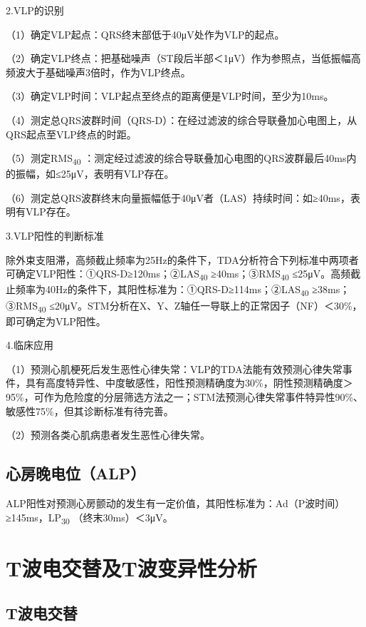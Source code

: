 2.VLP的识别

（1）确定VLP起点：QRS终末部低于40μV处作为VLP的起点。

（2）确定VLP终点：把基础噪声（ST段后半部＜1μV）作为参照点，当低振幅高频波大于基础噪声3倍时，作为VLP终点。

（3）确定VLP时间：VLP起点至终点的距离便是VLP时间，至少为10ms。

（4）测定总QRS波群时间（QRS-D）：在经过滤波的综合导联叠加心电图上，从QRS起点至VLP终点的时距。

（5）测定RMS\textsubscript{40}
：测定经过滤波的综合导联叠加心电图的QRS波群最后40ms内的振幅，如≤25μV，表明有VLP存在。

（6）测定总QRS波群终末向量振幅低于40μV者（LAS）持续时间：如≥40ms，表明有VLP存在。

3.VLP阳性的判断标准

除外束支阻滞，高频截止频率为25Hz的条件下，TDA分析符合下列标准中两项者可确定VLP阳性：①QRS-D≥120ms；②LAS\textsubscript{40}
≥40ms；③RMS\textsubscript{40}
≤25μV。高频截止频率为40Hz的条件下，其阳性标准为：①QRS-D≥114ms；②LAS\textsubscript{40}
≥38ms；③RMS\textsubscript{40}
≤20μV。STM分析在X、Y、Z轴任一导联上的正常因子（NF）＜30\%，即可确定为VLP阳性。

4.临床应用

（1）预测心肌梗死后发生恶性心律失常：VLP的TDA法能有效预测心律失常事件，具有高度特异性、中度敏感性，阳性预测精确度为30\%，阴性预测精确度＞95\%，可作为危险度的分层筛选方法之一；STM法预测心律失常事件特异性90\%、敏感性75\%，但其诊断标准有待完善。

（2）预测各类心肌病患者发生恶性心律失常。

\protect\hypertarget{text00056.htmlux5cux23subid664}{}{}

\subsection{心房晚电位（ALP）}

ALP阳性对预测心房颤动的发生有一定价值，其阳性标准为：Ad（P波时间）≥145ms，LP\textsubscript{30}
（终末30ms）＜3μV。

\protect\hypertarget{text00056.htmlux5cux23subid665}{}{}

\section{T波电交替及T波变异性分析}

\protect\hypertarget{text00056.htmlux5cux23subid666}{}{}

\subsection{T波电交替}

